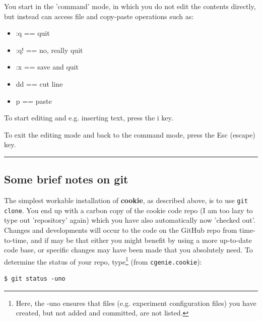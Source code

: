 You start in the 'command' mode, in which you do not edit the contents directly, but instead can access file and copy-paste operations such as:

\vspace{2mm}\begin{itemize}[noitemsep]
\setlength{\itemindent}{.2in}
\item :q == quit
\item :q! == no, really quit
\item :x == save and quit
\item dd == cut line
\item p == paste
\end{itemize}\vspace{2mm}

To start editing and e.g. inserting text, press the \textsf{i} key.

To exit the editing mode and back to the command mode, press the \textsf{Esc} (escape) key.

\vspace{1mm}\noindent\rule{4cm}{0.5pt}\vspace{2mm}

\newpage

\subsection*{Some brief notes on git}

The simplest workable installation of \textbf{cookie}, as described above, is to use \texttt{git clone}. You end up with a carbon copy of the cookie code repo (I am too lazy to type out 'repository' again) which you have also automatically now 'checked out'. Changes and developments will occur to the code on the GitHub repo from time-to-time, and if may be that either you might benefit by using a more up-to-date code base, or specific changes may have been made that you absolutely need. To determine the status of your repo, type\footnote{Here, the -uno ensures that files (e.g. experiment configuration files) you have created, but not added and committed, are not listed.} (from \texttt{cgenie.cookie}):

\vspace{-2mm}\small\begin{verbatim}
$ git status -uno
\end{verbatim}\normalsize\vspace{-2mm}

